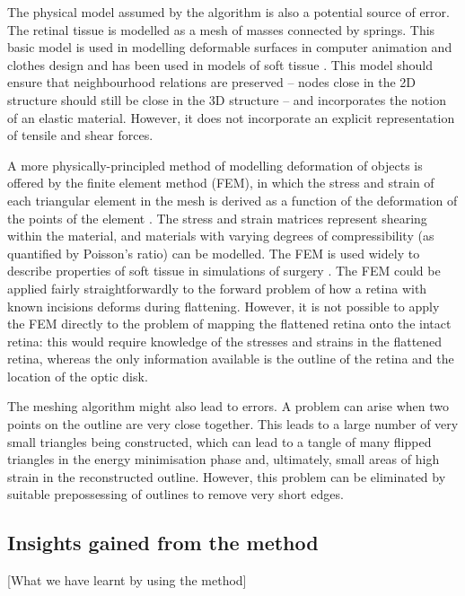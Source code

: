 \documentclass[10pt]{article}
\newcommand{\todo}[1]{{\color{red}[#1]}}
\begin{document}
The physical model assumed by the algorithm is also a potential source
of error. The retinal tissue is modelled as a mesh of masses connected
by springs. This basic model is used in modelling deformable surfaces
in computer animation and clothes design
\cite{FanEtal98spri,MaCaEtal99flat,WangEtal02surf} and has been used
in models of soft tissue \cite{SkriDunc99real}.  This model should
ensure that neighbourhood relations are preserved -- nodes close in
the 2D structure should still be close in the 3D structure -- and
incorporates the notion of an elastic material. However, it does not
incorporate an explicit representation of tensile and shear forces.

A more physically-principled method of modelling deformation of
objects is offered by the finite element method (FEM), in which the
stress and strain of each triangular element in the mesh is derived as
a function of the deformation of the points of the element
\cite{ZienTayl00fini}. The stress and strain matrices represent
shearing within the material, and materials with varying degrees of
compressibility (as quantified by Poisson's ratio) can be modelled.
The FEM is used widely to describe properties of soft tissue in
simulations of surgery \cite{CartEtal05appl}. The FEM could be applied
fairly straightforwardly to the forward problem of how a retina with
known incisions deforms during flattening. However, it is not possible
to apply the FEM directly to the problem of mapping the flattened
retina onto the intact retina: this would require knowledge of the
stresses and strains in the flattened retina, whereas the only
information available is the outline of the retina and the location of
the optic disk.

The meshing algorithm might also lead to errors. A problem can arise
when two points on the outline are very close together. This leads to
a large number of very small triangles being constructed, which can
lead to a tangle of many flipped triangles in the energy minimisation
phase and, ultimately, small areas of high strain in the reconstructed
outline. However, this problem can be eliminated by suitable
prepossessing of outlines to remove very short edges.

\subsection*{Insights gained from the method}

\todo{What we have learnt by using the method}
\end{document}
